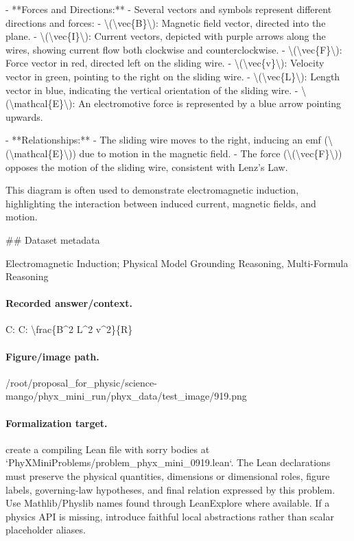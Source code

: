 - **Forces and Directions:**
  - Several vectors and symbols represent different directions and forces:
    - \textbackslash{}(\textbackslash{}vec\{B\}\textbackslash{}): Magnetic field vector, directed into the plane.
    - \textbackslash{}(\textbackslash{}vec\{I\}\textbackslash{}): Current vectors, depicted with purple arrows along the wires, showing current flow both clockwise and counterclockwise.
    - \textbackslash{}(\textbackslash{}vec\{F\}\textbackslash{}): Force vector in red, directed left on the sliding wire.
    - \textbackslash{}(\textbackslash{}vec\{v\}\textbackslash{}): Velocity vector in green, pointing to the right on the sliding wire.
    - \textbackslash{}(\textbackslash{}vec\{L\}\textbackslash{}): Length vector in blue, indicating the vertical orientation of the sliding wire.
    - \textbackslash{}(\textbackslash{}mathcal\{E\}\textbackslash{}): An electromotive force is represented by a blue arrow pointing upwards.

- **Relationships:**
  - The sliding wire moves to the right, inducing an emf (\textbackslash{}(\textbackslash{}mathcal\{E\}\textbackslash{})) due to motion in the magnetic field.
  - The force (\textbackslash{}(\textbackslash{}vec\{F\}\textbackslash{})) opposes the motion of the sliding wire, consistent with Lenz's Law.

This diagram is often used to demonstrate electromagnetic induction, highlighting the interaction between induced current, magnetic fields, and motion.

\#\# Dataset metadata

Electromagnetic Induction; Physical Model Grounding Reasoning, Multi-Formula Reasoning

\paragraph{Recorded answer/context.}
C: C: \textbackslash{}frac\{B\textasciicircum{}2 L\textasciicircum{}2 v\textasciicircum{}2\}\{R\}

\paragraph{Figure/image path.}
/root/proposal\_for\_physic/science-mango/phyx\_mini\_run/phyx\_data/test\_image/919.png

\paragraph{Formalization target.}
create a compiling Lean file with sorry bodies at `PhyXMiniProblems/problem\_phyx\_mini\_0919.lean`. The Lean declarations must preserve the physical quantities, dimensions or dimensional roles, figure labels, governing-law hypotheses, and final relation expressed by this problem.
Use Mathlib/Physlib names found through LeanExplore where available. If a physics API is missing, introduce faithful local abstractions rather than scalar placeholder aliases.

